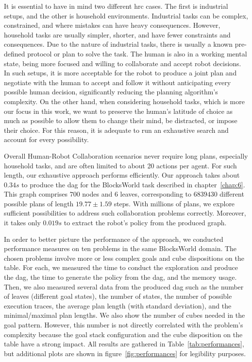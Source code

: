It is essential to have in mind two different \acrshort{hrc} cases. The first is industrial setups, and the other is household environments. Industrial tasks can be complex, constrained, and where mistakes can have heavy consequences. However, household tasks are usually simpler, shorter, and have fewer constraints and consequences. Due to the nature of industrial tasks, there is usually a known pre-defined protocol or plan to solve the task. The human is also in a working mental state, being more focused and willing to collaborate and accept robot decisions. In such setups, it is more acceptable for the robot to produce a joint plan and negotiate with the human to accept and follow it without anticipating every possible human decision, significantly reducing the planning algorithm's complexity.
On the other hand, when considering household tasks, which is more our focus in this work, we want to preserve the human's latitude of choice as much as possible to allow them to change their mind, be distracted, or impose their choice. For this reason, it is adequate to run an exhaustive search and account for every possibility. 

Overall Human-Robot Collaboration scenarios never require long plans, especially household tasks, and are often limited to about 20 actions per agent. For such length, our exhaustive approach performs efficiently. Our approach takes about $0.34s$ to produce the \acrshort{dag} for the BlocksWorld task described in chapter~\ref{chap:6}. This graph comprises $700$ nodes and $6$ leaves, corresponding to $6839430$ different possible plans of length $19.77 \pm 1.59$ steps. With millions of plans, we explore sufficient possibilities to address such collaboration problems correctly. Moreover, it takes only $0.019s$ to extract the robot's policy from the produced graph. 

In order to better picture the performance of the approach, we conducted performance measures on ten problems in the same BlocksWorld domain. The chosen problems involve more or less complex goals and cube dispositions on the table. For each, we measured the time to conduct the exploration and produce the \acrshort{dag}, the time to generate the policy from the \acrshort{dag}, and the memory usage. Then, we also measured several data from the produced \acrshort{dag} such as the number of leaves (different goal states), the number of states, the number of possible execution traces, the average plan length (with standard deviation), and the minimal/maximal plan lengths. We also show the number of cubes needed in the goal pattern. However, this number is not directly correlated with the problem's complexity because the goal stack configuration and the cube disposition on the table have a strong impact. All results are gathered in Table~\ref{tab:performances}, but additional plots are shown in figure~\ref{fig:performances} for legibility purposes.


